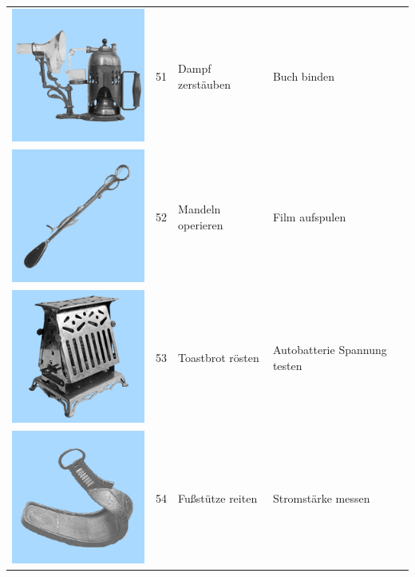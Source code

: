 \documentclass[
  english,
  doc,12pt,twoside,floatsintext]{apa7}
\begin{document}
\begin{center}
\begin{ThreePartTable}
\begin{longtable}{llll}
\includegraphics[valign=c, scale=0.19]{../materials/unfamiliar/51.png} & 51 & Dampf zerstäuben & Buch binden\\
\includegraphics[valign=c, scale=0.19]{../materials/unfamiliar/52.png} & 52 & Mandeln operieren & Film aufspulen\\
\includegraphics[valign=c, scale=0.19]{../materials/unfamiliar/53.png} & 53 & Toastbrot rösten & Autobatterie Spannung testen\\
\includegraphics[valign=c, scale=0.19]{../materials/unfamiliar/54.png} & 54 & Fußstütze reiten & Stromstärke messen\\

\end{longtable}
\end{ThreePartTable}
\end{center}
\end{document}

